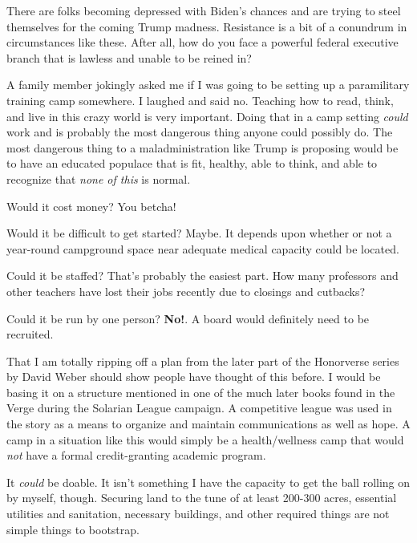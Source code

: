 There are folks becoming depressed with Biden's chances and are trying
to steel themselves for the coming Trump madness. Resistance is a bit of
a conundrum in circumstances like these. After all, how do you face a
powerful federal executive branch that is lawless and unable to be
reined in?

A family member jokingly asked me if I was going to be setting up a
paramilitary training camp somewhere. I laughed and said no. Teaching
how to read, think, and live in this crazy world is very important.
Doing that in a camp setting \emph{could} work and is probably the most
dangerous thing anyone could possibly do. The most dangerous thing to a
maladministration like Trump is proposing would be to have an educated
populace that is fit, healthy, able to think, and able to recognize that
\emph{none of this} is normal.

Would it cost money? You betcha!

Would it be difficult to get started? Maybe. It depends upon whether or
not a year-round campground space near adequate medical capacity could
be located.

Could it be staffed? That's probably the easiest part. How many
professors and other teachers have lost their jobs recently due to
closings and cutbacks?

Could it be run by one person? \textbf{No!}. A board would definitely
need to be recruited.

That I am totally ripping off a plan from the later part of the
Honorverse series by David Weber should show people have thought of this
before. I would be basing it on a structure mentioned in one of the much
later books found in the Verge during the Solarian League campaign. A
competitive league was used in the story as a means to organize and
maintain communications as well as hope. A camp in a situation like this
would simply be a health/wellness camp that would \emph{not} have a
formal credit-granting academic program.

It \emph{could} be doable. It isn't something I have the capacity to get
the ball rolling on by myself, though. Securing land to the tune of at
least 200-300 acres, essential utilities and sanitation, necessary
buildings, and other required things are not simple things to bootstrap.
